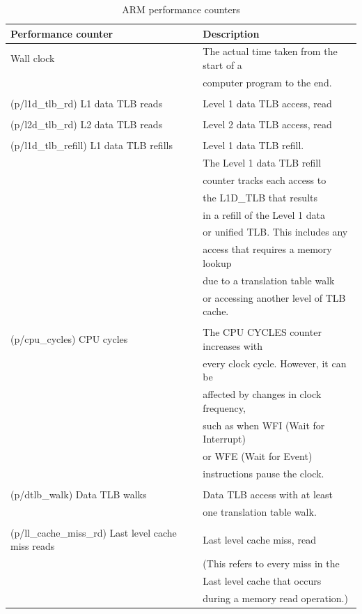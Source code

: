 \documentclass[11pt]{article}
\begin{document}
\begin{table}[htbp]
\caption{\label{tab:org246a883}ARM performance counters}
\centering
\begin{tabular}{|l|l|}
\hline
Performance counter & Description \\
\hline
Wall clock & The actual time taken from the start of a \\
 & computer program to the end. \\
 & \\
(p/l1d\_tlb\_rd) L1 data TLB reads & Level 1 data TLB access, read \\
 & \\
(p/l2d\_tlb\_rd) L2 data TLB reads & Level 2 data TLB access, read \\
 & \\
(p/l1d\_tlb\_refill) L1 data TLB refills & Level 1 data TLB refill. \\
 & The Level 1 data TLB refill \\
 & counter tracks each access to \\
 & the L1D\_TLB that results \\
 & in a refill of the Level 1 data \\
 & or unified TLB. This includes any \\
 & access that requires a memory lookup \\
 & due to a translation table walk \\
 & or accessing another level of TLB cache. \\
 & \\
(p/cpu\_cycles) CPU cycles & The CPU CYCLES counter increases with \\
 & every clock cycle. However, it can be \\
 & affected by changes in clock frequency, \\
 & such as when WFI (Wait for Interrupt) \\
 & or WFE (Wait for Event) \\
 & instructions pause the clock. \\
 & \\
(p/dtlb\_walk) Data TLB walks & Data TLB access with at least \\
 & one translation table walk. \\
 & \\
(p/ll\_cache\_miss\_rd) Last level cache miss reads & Last level cache miss, read \\
 & (This refers to every miss in the \\
 & Last level cache that occurs \\
 & during a memory read operation.) \\
\hline
\end{tabular}
\end{table}
\end{document}
